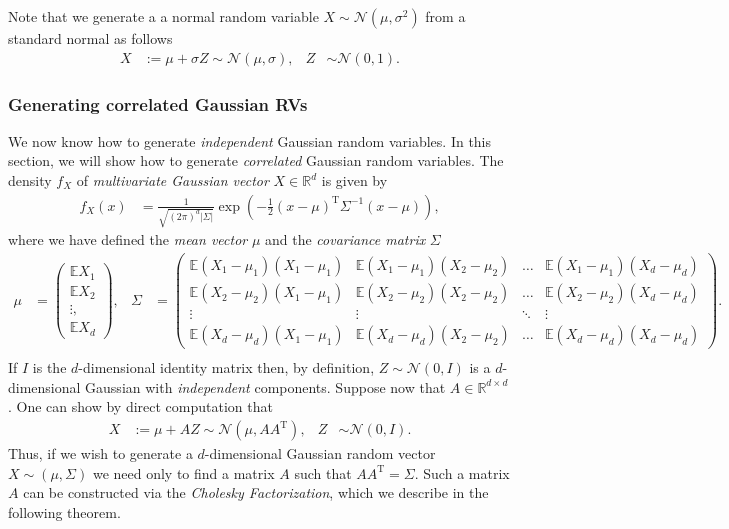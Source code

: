 \documentclass[12pt]{book}
\numberwithin{equation}{chapter}
\theoremstyle{plain}
\numberwithin{theorem}{section}
\theoremstyle{definition}
\numberwithin{exercise}{chapter}
\newcommand{\<}{\langle}
\renewcommand{\>}{\rangle}
\renewcommand{\(}{\left(}
\renewcommand{\)}{\right)}
\renewcommand{\[}{\left[}
\renewcommand{\]}{\right]}
\newcommand\Eb{\mathds{E}}
\newcommand\Rb{\mathds{R}}
\newcommand\Nc{\mathscr{N}}
\newcommand\sig{\sigma}
\newcommand\Sig{\Sigma}
\begin{document}
\noindent
Note that we generate a a normal random variable $X \sim \Nc (\mu, \sig^2)$ from a standard normal as follows
\begin{align}
X
	&:=	\mu + \sig Z \sim \Nc(\mu,\sig), &
Z
	&\sim \Nc(0,1) .
\end{align}


\subsubsection{Generating correlated Gaussian RVs}
We now know how to generate \emph{independent} Gaussian random variables.  In this section, we will show how to generate \emph{correlated} Gaussian random variables.  The density $f_X$ of \emph{multivariate Gaussian vector} $X \in \Rb^d$ is given by
\begin{align}
f_X(x)
	&=	\frac{1}{\sqrt{(2\pi)^d |\Sigma|}}\exp\( - \tfrac{1}{2} (x - \mu)^\text{T} \Sigma^{-1} (x - \mu) \) ,
\end{align}
where we have defined the \emph{mean vector} $\mu$ and the \emph{covariance matrix} $\Sigma$
\begin{align}
\mu
	&=	\( \begin{array}{c}
			\Eb X_1 \\ \Eb X_2 \\ \vdots, \\ \Eb X_d 
			\end{array} \) , &
\Sigma
	&=	\( \begin{array}{cccc}
			\Eb (X_1-\mu_1)(X_1-\mu_1) 	& \Eb (X_1-\mu_1)(X_2-\mu_2) & \ldots & \Eb (X_1-\mu_1)(X_d-\mu_d) \\
			\Eb (X_2-\mu_2)(X_1-\mu_1) 	& \Eb (X_2-\mu_2)(X_2-\mu_2) & \ldots & \Eb (X_2-\mu_2)(X_d-\mu_d) \\
			\vdots											&	\vdots										& \ddots & \vdots \\
			\Eb (X_d-\mu_d)(X_1-\mu_1) 	& \Eb (X_d-\mu_d)(X_2-\mu_2) & \ldots & \Eb (X_d-\mu_d)(X_d-\mu_d)
			\end{array} \) . \\[-2em]
\end{align}
If $I$ is the $d$-dimensional identity matrix then, by definition, $Z \sim \Nc( 0, I)$ is a $d$-dimensional Gaussian with \emph{independent} components.
Suppose now that $A \in \Rb^{d \times d}$.  One can show by direct computation that
\begin{align}
X
	&:=	\mu + A Z \sim \Nc( \mu, A A^\text{T} ) , &
Z
	&\sim \Nc( 0, I ) .
\end{align}
Thus, if we wish to generate a $d$-dimensional Gaussian random vector $X \sim (\mu,\Sig)$ we need only to find a matrix $A$ such that $A A^\text{T} = \Sigma$.  Such a matrix $A$ can be constructed via the \emph{Cholesky Factorization}, which we describe in the following theorem.
\end{document}
